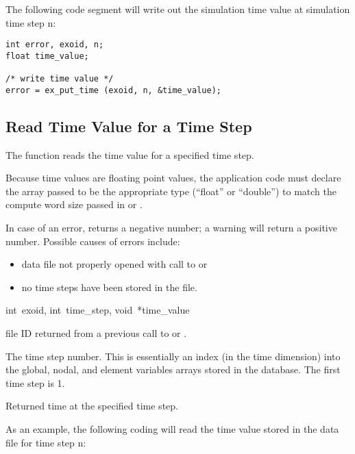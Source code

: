 The following code segment will write out the simulation time value at
simulation time step n:

\begin{lstlisting}
int error, exoid, n;
float time_value;

/* write time value */
error = ex_put_time (exoid, n, &time_value);
\end{lstlisting}


\subsection{Read Time Value for a Time Step}

The function  reads the time value for a
specified time step.

Because time values are floating point values, the application code
must declare the array passed to be the appropriate type (``float'' or
``double'') to match the compute word size passed in
 or .

In case of an error,  returns a negative number;
a warning will return a positive number. Possible causes of errors
include:

\begin{itemize}
 \item data file not properly opened with call to 
 or 

 \item no time steps have been stored in the file.
\end{itemize}

{int~exoid,
int~time_step,
void~*time_value}

\begin{parameters}
\item[{int exoid \R{}}]
\exo{} file ID returned from a previous call to 
or .

\item[{int time_step \R{}}]
The time step number. This is essentially an index (in the time
dimension) into the global, nodal, and element variables arrays stored
in the database. The first time step is 1.

\item[{void* time_value \W{}}]
Returned time at the specified time step.
\end{parameters}

As an example, the following coding will read the time value stored in
the data file for time step n:

